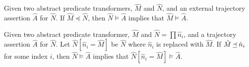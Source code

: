 \begin{theorem}
Given two abstract predicate transformers, $\hat M$ and $\hat N$, and an external trajectory assertion $\hat A$ for $\hat N$. If $\hat M \preceq \hat N$, then $\hat N \models \hat A$ implies that $\hat M \models \hat A$.
\end{theorem}

\begin{corollary}
Given two abstract predicate transformer, $\hat M$ and $\hat N = \prod \hat n_{i}$, and a trajectory assertion $\hat A$ for $\hat N$. Let $\hat N[\hat n_{i} = \hat M]$ be $\hat N$ where $\hat n_{i}$ is replaced with $\hat M$. If $\hat M \operatorname{\mathrel{\preceq}} \hat n_{i}$ for some index $i$, then $\hat N \models \hat A$ implies that $\hat N[\hat n_{i} = \hat M] \models \hat A$.
\end{corollary}

